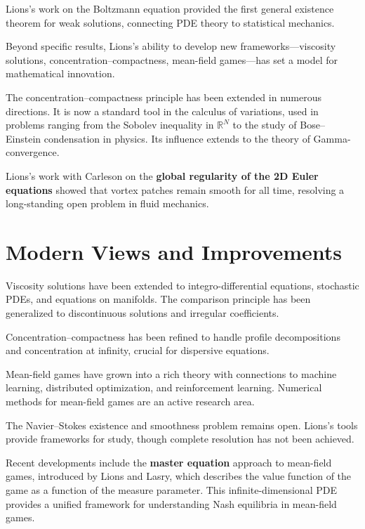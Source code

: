 Lions's work on the Boltzmann equation provided the first general
existence theorem for weak solutions, connecting PDE theory to
statistical mechanics.

Beyond specific results, Lions's ability to develop new
frameworks---viscosity solutions, concentration--compactness,
mean-field games---has set a model for mathematical innovation.

The concentration--compactness principle has been extended in
numerous directions.  It is now a standard tool in the calculus of
variations, used in problems ranging from the Sobolev inequality in
$\mathbb{R}^N$ to the study of Bose--Einstein condensation in
physics.  Its influence extends to the theory of
Gamma-convergence.

Lions's work with Carleson on the \textbf{global regularity of the
2D Euler equations} showed that vortex patches remain smooth for all
time, resolving a long-standing open problem in fluid mechanics.

\section{Modern Views and Improvements}

Viscosity solutions have been extended to integro-differential
equations, stochastic PDEs, and equations on manifolds.  The
comparison principle has been generalized to discontinuous solutions
and irregular coefficients.

Concentration--compactness has been refined to handle profile
decompositions and concentration at infinity, crucial for
dispersive equations.

Mean-field games have grown into a rich theory with connections to
machine learning, distributed optimization, and reinforcement
learning.  Numerical methods for mean-field games are an active
research area.

The Navier--Stokes existence and smoothness problem remains open.
Lions's tools provide frameworks for study, though complete
resolution has not been achieved.

Recent developments include the \textbf{master equation} approach
to mean-field games, introduced by Lions and Lasry, which describes
the value function of the game as a function of the measure
parameter.  This infinite-dimensional PDE provides a unified
framework for understanding Nash equilibria in mean-field games.

